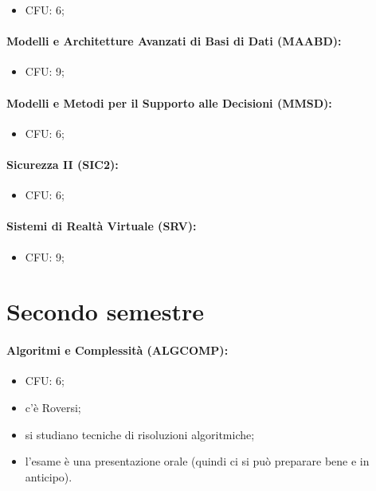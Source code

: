\begin{itemize}
  \item CFU: 6;
\end{itemize}

\paragraph{Modelli e Architetture Avanzati di Basi
di Dati (MAABD):}

\begin{itemize}
  \item CFU: 9;
\end{itemize}

\paragraph{Modelli e Metodi per il Supporto alle Decisioni (MMSD):}

\begin{itemize}
  \item CFU: 6;
\end{itemize}

\paragraph{Sicurezza II (SIC2):}

\begin{itemize}
  \item CFU: 6;
\end{itemize}

\paragraph{Sistemi di Realtà Virtuale (SRV):}

\begin{itemize}
  \item CFU: 9;
\end{itemize}

\section{Secondo semestre}

\paragraph{Algoritmi e Complessità (ALGCOMP):}

\begin{itemize}
  \item CFU: 6;
  \item c'è Roversi;
  \item si studiano tecniche di risoluzioni algoritmiche;
  \item l'esame è una presentazione orale (quindi ci si può preparare bene e in anticipo).
\end{itemize}

